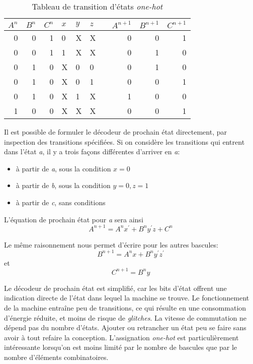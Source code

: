 \documentclass[11pt]{article}
\begin{document}
\begin{table}[htbp]
\caption{\label{tab:org2022d3a}Tableau de transition d'états \emph{one-hot}}
\centering
\begin{tabular}{rrrllllrrr}
\(A^n\) & \(B^n\) & \(C^n\) & \(x\) & \(y\) & \(z\) &  & \(A^{n+1}\) & \(B^{n+1}\) & \(C^{n+1}\)\\
\hline
0 & 0 & 1 & 0 & X & X &  & 0 & 0 & 1\\
0 & 0 & 1 & 1 & X & X &  & 0 & 1 & 0\\
0 & 1 & 0 & X & 0 & 0 &  & 0 & 1 & 0\\
0 & 1 & 0 & X & 0 & 1 &  & 0 & 0 & 1\\
0 & 1 & 0 & X & 1 & X &  & 1 & 0 & 0\\
1 & 0 & 0 & X & X & X &  & 0 & 0 & 1\\
\end{tabular}
\end{table}

Il est possible de formuler le décodeur de prochain état directement,
par inspection des transitions spécifiées.  Si on considère les
transitions qui entrent dans l'état \emph{a}, il y a trois façons différentes
d'arriver en \emph{a}:
\begin{itemize}
\item à partir de \emph{a}, sous la condition \(x=0\)
\item à partir de \emph{b}, sous la condition \(y=0, z=1\)
\item à partir de \emph{c}, sans conditions
\end{itemize}

L'équation de prochain état pour \emph{a} sera ainsi 
$$
A^{n+1} = A^{n}x^\prime + B^n y^\prime z + C^n
$$

Le même raisonnement nous permet d'écrire pour les autres bascules:
$$
B^{n+1} = A^{n}x + B^n y^\prime z^\prime
$$
et 
$$
C^{n+1} = B^n y
$$

Le décodeur de prochain état est simplifié, car les bits d'état
offrent une indication directe de l'état dans lequel la machine se
trouve. Le fonctionnement de la machine entraîne peu de transitions,
ce qui résulte en une consommation d'énergie réduite, et moins de
risque de \emph{glitches}. La vitesse de commutation ne dépend pas du
nombre d'états. Ajouter ou retrancher un état peu se faire sans avoir
à tout refaire la conception.  L'assignation \emph{one-hot} est
particulièrement intéressante lorsqu'on est moins limité par le nombre
de bascules que par le nombre d'éléments combinatoires. 
\end{document}
